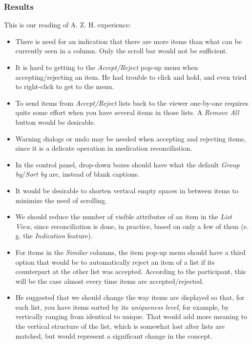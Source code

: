 \documentclass{chi2009}
\begin{document}
\subsubsection{Results}
This is our reading of A. Z. H. experience:
\begin{itemize}
\item There is need for an indication that there are more items than what can be currently seen in a column. Only the scroll bar would not be sufficient.
\item It is hard to getting to the \textit{Accept/Reject} pop-up menu when accepting/rejecting an item. He had trouble to click and hold, and even tried to right-click to get to the menu.
\item To send items from \textit{Accept/Reject} lists back to the viewer one-by-one requires quite some effort when you have several items in those lists. A \textit{Remove All} button would be desirable.
\item Warning dialogs or undo may be needed when accepting and rejecting items, since it is a delicate operation in medication reconciliation.
\item In the control panel, drop-down boxes should have what the default \textit{Group by}/\textit{Sort by} are, instead of blank captions.
\item It would be desirable to shorten vertical empty spaces in between items to minimize the need of scrolling.
\item We should reduce the number of visible attributes of an item in the \textit{List View}, since reconciliation is done, in practice, based on only a few of them (e. g. the \textit{Indication} feature).
\item For items in the \textit{Similar} columns, the item pop-up menu should have a third option that would be to automatically reject an item of a list if its counterpart at the other list was accepted. According to the participant, this will be the case almost every time items are accepted/rejected.
\item He suggested that we should change the way items are displayed so that, for each list, you have items sorted by its \textit{uniqueness level}, for example, by vertically ranging from identical to unique. That would add more meaning to the vertical structure of the list, which is somewhat lost after lists are matched, but would represent a significant change in the concept.

\end{itemize}
\end{document}
